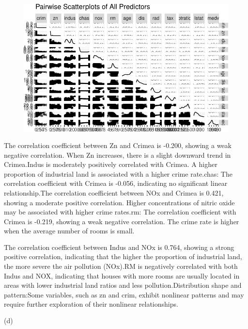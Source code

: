 \documentclass[
]{article}
\begin{document}
\begin{figure}[H]

{\centering \includegraphics{hw1_files/figure-pdf/unnamed-chunk-7-1.pdf}

}

\end{figure}

The correlation coefficient between Zn and Crimea is -0.200, showing a
weak negative correlation. When Zn increases, there is a slight downward
trend in Crimea.Indus is moderately positively correlated with Crimea. A
higher proportion of industrial land is associated with a higher crime
rate.chas: The correlation coefficient with Crimea is -0.056, indicating
no significant linear relationship.The correlation coefficient between
NOx and Crimea is 0.421, showing a moderate positive correlation. Higher
concentrations of nitric oxide may be associated with higher crime
rates.rm: The correlation coefficient with Crimea is -0.219, showing a
weak negative correlation. The crime rate is higher when the average
number of rooms is small.

The correlation coefficient between Indus and NOx is 0.764, showing a
strong positive correlation, indicating that the higher the proportion
of industrial land, the more severe the air pollution (NOx).RM is
negatively correlated with both Indus and NOX, indicating that houses
with more rooms are usually located in areas with lower industrial land
ratios and less pollution.Distribution shape and pattern:Some variables,
such as zn and crim, exhibit nonlinear patterns and may require further
exploration of their nonlinear relationships.

(d)
\end{document}
